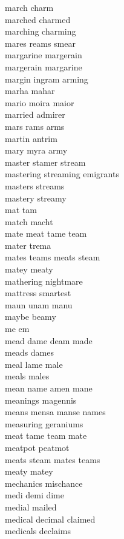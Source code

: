 march charm\\
marched charmed\\
marching charming\\
mares reams smear\\
margarine margerain\\
margerain margarine\\
margin ingram arming\\
marha mahar\\
mario moira maior\\
married admirer\\
mars rams arms\\
martin antrim\\
mary myra army\\
master stamer stream\\
mastering streaming emigrants\\
masters streams\\
mastery streamy\\
mat tam\\
match macht\\
mate meat tame team\\
mater trema\\
mates teams meats steam\\
matey meaty\\
mathering nightmare\\
mattress smartest\\
maun unam manu\\
maybe beamy\\
me em\\
mead dame deam made\\
meads dames\\
meal lame male\\
meals males\\
mean name amen mane\\
meanings magennis\\
means mensa manse names\\
measuring geraniums\\
meat tame team mate\\
meatpot peatmot\\
meats steam mates teams\\
meaty matey\\
mechanics mischance\\
medi demi dime\\
medial mailed\\
medical decimal claimed\\
medicals declaims\\
